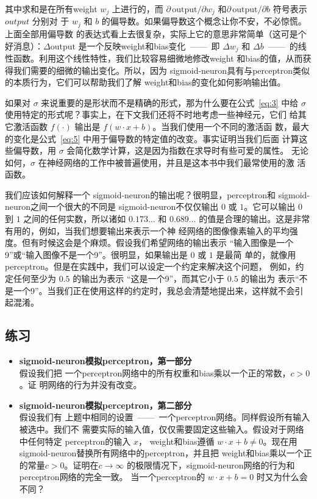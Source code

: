 其中求和是在所有\gls*{weight} $w_j$ 上进行的，而 $\partial \, \mbox{output} /
\partial w_j$ 和$\partial \, \mbox{output} /\partial b$ 符号表示 $output$ 分别对
于 $w_j$ 和 $b$ 的偏导数。如果偏导数这个概念让你不安，不必惊慌。上面全部用偏导数
的表达式看上去很复杂，实际上它的意思非常简单（这可是个好消息）：$\Delta
\mbox{output}$ 是一个反映\gls*{weight}和\gls*{bias}变化~——~即 $\Delta w_j$ 和
$\Delta b$~——~的线性函数。利用这个线性特性，我们比较容易细微地修改\gls*{weight}
和\gls*{bias}的值，从而获得我们需要的细微的输出变化。所以，因为%
\gls*{sigmoid-neuron}具有与\gls*{perceptron}类似的本质行为，它们可以帮助我们了解%
\gls*{weight}和\gls*{bias}的变化如何影响输出值。

如果对 $\sigma$ 来说重要的是形状而不是精确的形式，那为什么要在公式~\eqref{eq:3}
中给 $\sigma$ 使用特定的形式呢？事实上，在下文我们还将不时地考虑一些神经元，它们
给其它激活函数 $f(\cdot)$ 输出是 $f(w \cdot x + b)$。当我们使用一个不同的激活函
数，最大的变化是公式~\eqref{eq:5} 中用于偏导数的特定值的改变。事实证明当我们后面
计算这些偏导数，用 $\sigma$ 会简化数学计算，这是因为指数在求导时有些可爱的属性。
无论如何，$\sigma$ 在神经网络的工作中被普遍使用，并且是这本书中我们最常使用的激
活函数。

我们应该如何解释一个 \gls*{sigmoid-neuron}的输出呢？很明显，\gls*{perceptron}和
\gls*{sigmoid-neuron}之间一个很大的不同是 \gls*{sigmoid-neuron}不仅仅输出 $0$ 或
$1$。它可以输出 $0$ 到 $1$ 之间的任何实数，所以诸如 $0.173\ldots$ 和
$0.689\ldots$ 的值是合理的输出。这是非常有用的，例如，当我们想要输出来表示一个神
经网络的图像像素输入的平均强度。但有时候这会是个麻烦。假设我们希望网络的输出表示
“输入图像是一个9”或“输入图像不是一个9”。很明显，如果输出是 $0$ 或 $1$ 是最简
单的，就像用\gls*{perceptron}。但是在实践中，我们可以设定一个约定来解决这个问题，
例如，约定任何至少为 $0.5$ 的输出为表示 “这是一个9”，而其它小于 $0.5$ 的输出为
表示“不是一个9”。当我们正在使用这样的约定时，我总会清楚地提出来，这样就不会引
起混淆。

\subsection*{练习}

\begin{itemize}
\item \textbf{\gls*{sigmoid-neuron}模拟\gls*{perceptron}，第一部分}\\假设我们把
  一个\gls*{perceptron}网络中的所有权重和\gls*{bias}乘以一个正的常数，$c>0$。证
  明网络的行为并没有改变。
\item \textbf{\gls*{sigmoid-neuron}模拟\gls*{perceptron}，第二部分}\\假设我们有
  上题中相同的设置~——~一个\gls*{perceptron}网络。同样假设所有输入被选中。我们不
  需要实际的输入值，仅仅需要固定这些输入。假设对于网络中任何特定%
  \gls*{perceptron}的输入 $x$， \gls*{weight}和\gls*{bias}遵循 $w \cdot x + b
  \neq 0$。现在用 \gls*{sigmoid-neuron}替换所有网络中的\gls*{perceptron}，并且把%
  \gls*{weight}和\gls*{bias}乘以一个正的常量$c>0$。证明在$c \rightarrow \infty$
  的极限情况下，\gls*{sigmoid-neuron}网络的行为和\gls*{perceptron}网络的完全一致。
  当一个\gls*{perceptron}的 $w \cdot x + b = 0$ 时又为什么会不同？
\end{itemize}

